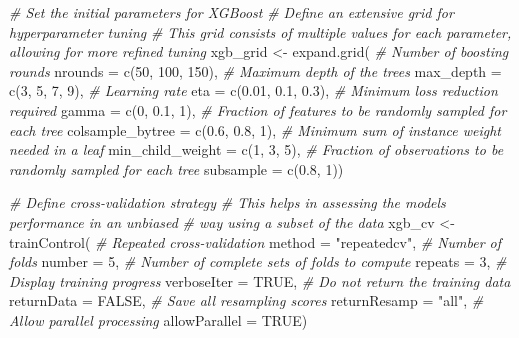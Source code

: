 \documentclass[
  11pt,
]{article}
\newenvironment{Shaded}{}{}
\newcommand{\AttributeTok}[1]{\textcolor[rgb]{0.49,0.56,0.16}{#1}}
\newcommand{\CommentTok}[1]{\textcolor[rgb]{0.38,0.63,0.69}{\textit{#1}}}
\newcommand{\ConstantTok}[1]{\textcolor[rgb]{0.53,0.00,0.00}{#1}}
\newcommand{\DecValTok}[1]{\textcolor[rgb]{0.25,0.63,0.44}{#1}}
\newcommand{\FloatTok}[1]{\textcolor[rgb]{0.25,0.63,0.44}{#1}}
\newcommand{\FunctionTok}[1]{\textcolor[rgb]{0.02,0.16,0.49}{#1}}
\newcommand{\NormalTok}[1]{#1}
\newcommand{\OtherTok}[1]{\textcolor[rgb]{0.00,0.44,0.13}{#1}}
\newcommand{\StringTok}[1]{\textcolor[rgb]{0.25,0.44,0.63}{#1}}
\begin{document}
\begin{Shaded}
\begin{Highlighting}[]
\CommentTok{\# Set the initial parameters for XGBoost}
\CommentTok{\# Define an extensive grid for hyperparameter tuning}
\CommentTok{\# This grid consists of multiple values for each parameter, allowing for more refined tuning}
\NormalTok{xgb\_grid }\OtherTok{\textless{}{-}} \FunctionTok{expand.grid}\NormalTok{(}
  \CommentTok{\# Number of boosting rounds}
  \AttributeTok{nrounds =} \FunctionTok{c}\NormalTok{(}\DecValTok{50}\NormalTok{, }\DecValTok{100}\NormalTok{, }\DecValTok{150}\NormalTok{),}
  \CommentTok{\# Maximum depth of the trees}
  \AttributeTok{max\_depth =} \FunctionTok{c}\NormalTok{(}\DecValTok{3}\NormalTok{, }\DecValTok{5}\NormalTok{, }\DecValTok{7}\NormalTok{, }\DecValTok{9}\NormalTok{),}
  \CommentTok{\# Learning rate}
  \AttributeTok{eta =} \FunctionTok{c}\NormalTok{(}\FloatTok{0.01}\NormalTok{, }\FloatTok{0.1}\NormalTok{, }\FloatTok{0.3}\NormalTok{),}
  \CommentTok{\# Minimum loss reduction required}
  \AttributeTok{gamma =} \FunctionTok{c}\NormalTok{(}\DecValTok{0}\NormalTok{, }\FloatTok{0.1}\NormalTok{, }\DecValTok{1}\NormalTok{),}
  \CommentTok{\# Fraction of features to be randomly sampled for each tree}
  \AttributeTok{colsample\_bytree =} \FunctionTok{c}\NormalTok{(}\FloatTok{0.6}\NormalTok{, }\FloatTok{0.8}\NormalTok{, }\DecValTok{1}\NormalTok{),}
  \CommentTok{\# Minimum sum of instance weight needed in a leaf}
  \AttributeTok{min\_child\_weight =} \FunctionTok{c}\NormalTok{(}\DecValTok{1}\NormalTok{, }\DecValTok{3}\NormalTok{, }\DecValTok{5}\NormalTok{),}
  \CommentTok{\# Fraction of observations to be randomly sampled for each tree}
  \AttributeTok{subsample =} \FunctionTok{c}\NormalTok{(}\FloatTok{0.8}\NormalTok{, }\DecValTok{1}\NormalTok{))}

\CommentTok{\# Define cross{-}validation strategy}
\CommentTok{\# This helps in assessing the model\textquotesingle{}s performance in an unbiased}
\CommentTok{\#   way using a subset of the data}
\NormalTok{xgb\_cv }\OtherTok{\textless{}{-}} \FunctionTok{trainControl}\NormalTok{(}
  \CommentTok{\# Repeated cross{-}validation}
  \AttributeTok{method =} \StringTok{"repeatedcv"}\NormalTok{,}
  \CommentTok{\# Number of folds}
  \AttributeTok{number =} \DecValTok{5}\NormalTok{,}
  \CommentTok{\# Number of complete sets of folds to compute}
  \AttributeTok{repeats =} \DecValTok{3}\NormalTok{,}
  \CommentTok{\# Display training progress}
  \AttributeTok{verboseIter =} \ConstantTok{TRUE}\NormalTok{,}
  \CommentTok{\# Do not return the training data}
  \AttributeTok{returnData =} \ConstantTok{FALSE}\NormalTok{,}
  \CommentTok{\# Save all resampling scores}
  \AttributeTok{returnResamp =} \StringTok{"all"}\NormalTok{,}
  \CommentTok{\# Allow parallel processing}
  \AttributeTok{allowParallel =} \ConstantTok{TRUE}\NormalTok{)}


\end{Highlighting}
\end{Shaded}
\end{document}

